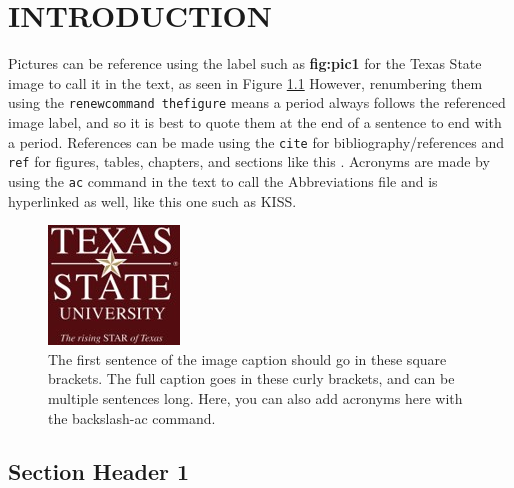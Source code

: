 \chapter{INTRODUCTION}\label{ch:introduction}








\setlength{\parindent}{10mm} %
\indent Pictures can be reference using the label such as \textbf{fig:pic1} for the Texas State image to call it in the text, as seen in Figure \ref{fig:pic1} However, renumbering them using the \texttt{renewcommand thefigure} means a period always follows the referenced image label, and so it is best to quote them at the end of a sentence to end with a period. References can be made using the \texttt{cite} for bibliography/references and \texttt{ref} for figures, tables, chapters, and sections like this \cite{einstein}. Acronyms are made by using the \texttt{ac} command in the text to call the Abbreviations file and is hyperlinked as well, like this one such as \ac{KISS}.


\setlength{\parindent}{10mm}
\lipsum[2]


\begin{figure}[h!]
    \renewcommand\thefigure{1.}
    \centering                 
    \includegraphics[scale=1]{Figs/Picture1.jpg}
    \captionsetup{font=small}
    \caption[The first sentence of the image caption should go in these square brackets.]{The first sentence of the image caption should go in these square brackets. The full caption goes in these curly brackets, and can be multiple sentences long. Here, you can also add acronyms here with the backslash-ac command.}
    \label{fig:pic1}
\end{figure}


\setlength{\parindent}{10mm}
\lipsum[3-4]



\flushleft
\section*{Section Header 1}


\setlength{\parindent}{10mm} %
\indent \lipsum[5]



\pagebreak